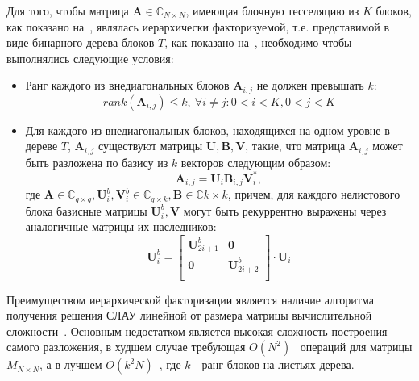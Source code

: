 Для того, чтобы матрица $\mathbf{A} \in \mathbb{C}_{N \times N}$, имеющая блочную тесселяцию из $K$ блоков, как показано на~, являлась иерархически факторизуемой, т.е. представимой в виде бинарного дерева блоков $T$, как показано на~, необходимо чтобы выполнялись следующие условия:
\begin{itemize}
	\item Ранг каждого из внедиагональных блоков $\mathbf{A}_{i,j}$ не должен превышать $k$:
		\[
			rank\left(\mathbf{A}_{i,j}\right) \le k,~\forall i \ne j: 0 < i < K, 0 < j < K
		\]
	\item Для каждого из внедиагональных блоков, находящихся на одном уровне в дереве $T$, $\mathbf{A}_{i,j}$ существуют матрицы $\mathbf{U}, \mathbf{B}, \mathbf{V}$, такие, что матрица $\mathbf{A}_{i,j}$ может быть разложена по базису из $k$ векторов следующим образом:
		\[
        	\mathbf{A}_{i,j} = \mathbf{U}_{i} \mathbf{B}_{i,j} \mathbf{V}^*_{i},
		\]
		где $\mathbf{A} \in \mathbb{C}_{q \times q}, \mathbf{U}^{b}_{i}, \mathbf{V}^{b}_{i} \in \mathbb{C}_{q \times k}, \mathbf{B} \in \mathbb{C}{k \times k}$, причем, для каждого нелистового блока базисные матрицы $\mathbf{U}^{b}_{i}, \mathbf{V}$ могут быть рекуррентно выражены через аналогичные матрицы их наследников:
		\[
			\mathbf{U}^{b}_{i} =
			\begin{bmatrix}
				\mathbf{U}^{b}_{2i+1} & \mathbf{0} \\
				\mathbf{0} & \mathbf{U}^{b}_{2i+2} \\
			\end{bmatrix}
			\cdot
			\mathbf{U}_{i} 
		\]
\end{itemize}


Преимуществом иерархической факторизации является наличие алгоритма получения решения СЛАУ линейной от размера матрицы вычислительной сложности~\cite{baseHSS}. Основным недостатком является высокая сложность построения самого разложения, в худшем случае требующая $O(N^2)$~\cite{fastHSS} операций для матрицы $M_{N \times N}$, а в лучшем $O(k^2N)$~\cite{probHSS}, где $k$ - ранг блоков на листьях дерева.


